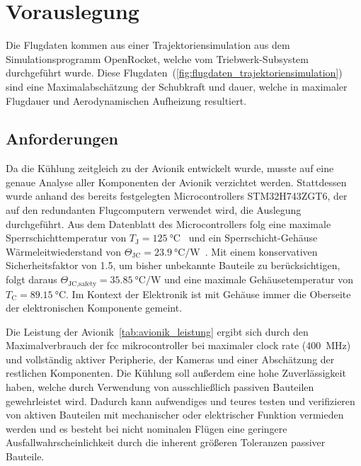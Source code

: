 \chapter{Vorauslegung}
\label{chap:Vorauslegung}
Die Flugdaten kommen aus einer Trajektoriensimulation aus dem Simulationsprogramm OpenRocket, welche vom Triebwerk-Subsystem durchgeführt wurde.
Diese Flugdaten~(\ref{fig:flugdaten_trajektoriensimulation}) sind eine Maximalabschätzung der Schubkraft und dauer, welche in maximaler Flugdauer und Aerodynamischen Aufheizung
resultiert.

\section{Anforderungen}

Da die Kühlung zeitgleich zu der Avionik entwickelt wurde, musste auf eine genaue Analyse aller Komponenten der Avionik verzichtet werden.
Stattdessen wurde anhand des bereits festgelegten Microcontrollers STM32H743ZGT6, der auf den redundanten Flugcomputern verwendet wird,
die Auslegung durchgeführt.
Aus dem Datenblatt des Microcontrollers folg eine maximale Sperrschichttemperatur von $T_\text{J} = \SI{125}{\degreeCelsius}$~\cite{STM32}
und ein Sperrschicht-Gehäuse Wärmeleitwiederstand von $\Theta_\text{JC} = \SI{23.9}{\degreeCelsius\per\watt}$~\cite{STM32}. Mit einem konservativen
Sicherheitsfaktor von 1.5, um bisher unbekannte Bauteile zu berücksichtigen, folgt daraus $\Theta_\text{JC,safety} = \SI{35.85}{\degreeCelsius\per\watt}$
und eine maximale Gehäusetemperatur von $T_\text{C} = \SI{89.15}{\degreeCelsius}$. Im Kontext der Elektronik ist mit Gehäuse immer die
Oberseite der elektronischen Komponente gemeint.

Die Leistung der Avionik~\ref{tab:avionik_leistung} ergibt sich durch den Maximalverbrauch der \ac{fcc} mikrocontroller bei maximaler clock rate
(\SI{400}{\mega\hertz}) und vollständig aktiver Peripherie, der Kameras und einer Abschätzung der restlichen Komponenten.
Die Kühlung soll außerdem eine hohe Zuverlässigkeit haben, welche durch Verwendung von ausschließlich passiven Bauteilen gewehrleistet wird.
Dadurch kann aufwendiges und teures testen und verifizieren von aktiven Bauteilen mit mechanischer oder elektrischer Funktion vermieden werden und es besteht bei
nicht nominalen Flügen eine geringere Ausfallwahrscheinlichkeit durch die inherent größeren Toleranzen passiver Bauteile.

